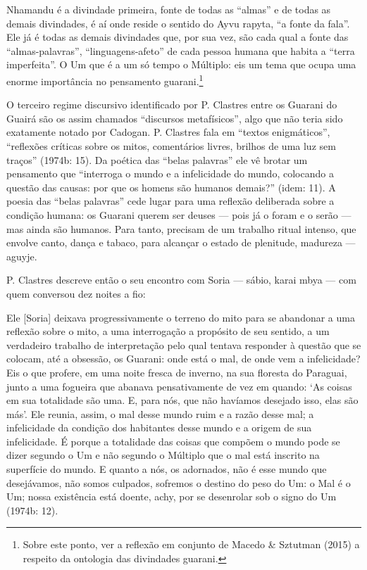 Nhamandu é a divindade primeira, fonte de todas as ``almas'' e de todas as
demais divindades, é aí onde reside o sentido do Ayvu rapyta, ``a fonte
da fala''. Ele já é todas as demais divindades que, por sua vez, são
cada qual a fonte das ``almas-palavras'', ``linguagens-afeto'' de cada
pessoa humana que habita a ``terra imperfeita''. O Um que é a um só tempo
o Múltiplo: eis um tema que ocupa uma enorme importância no pensamento
guarani.\footnote{Sobre este ponto, ver a reflexão em conjunto de
Macedo \& Sztutman (2015) a respeito da ontologia das divindades
guarani.}

O terceiro regime discursivo identificado por P. Clastres entre os
Guarani do Guairá são os assim chamados ``discursos metafísicos'', algo
que não teria sido exatamente notado por Cadogan. P. Clastres fala em
``textos enigmáticos'', ``reflexões críticas sobre os mitos, comentários
livres, brilhos de uma luz sem traços'' (1974b: 15). Da poética das
``belas palavras'' ele vê brotar um pensamento que ``interroga o mundo e a
infelicidade do mundo, colocando a questão das causas: por que os
homens são humanos demais?'' (idem: 11). A poesia das ``belas palavras''
cede lugar para uma reflexão deliberada sobre a condição humana: os
Guarani querem ser deuses — pois já o foram e o serão — mas ainda são
humanos. Para tanto, precisam de um trabalho ritual intenso, que
envolve canto, dança e tabaco, para alcançar o estado de plenitude,
madureza — aguyje. 

P. Clastres descreve então o seu encontro com Soria — sábio,  karai mbya
—  com quem conversou dez noites a fio: 

Ele [Soria] deixava progressivamente o terreno do mito para se abandonar
a uma reflexão sobre o mito, a uma interrogação a propósito de seu
sentido, a um verdadeiro trabalho de interpretação pelo qual tentava
responder à questão que se colocam, até a obsessão, os Guarani: onde
está o mal, de onde vem a infelicidade? Eis o que profere, em uma noite
fresca de inverno, na sua floresta do Paraguai, junto a uma fogueira
que abanava pensativamente de vez em quando: ‘As coisas em sua
totalidade são uma. E, para nós, que não havíamos desejado isso, elas
são más’. Ele reunia, assim, o mal desse mundo ruim e a razão desse
mal; a infelicidade da condição dos habitantes desse mundo e a origem
de sua infelicidade. É porque a totalidade das coisas que compõem o
mundo pode se dizer segundo o Um e não segundo o Múltiplo que o mal
está inscrito na superfície do mundo. E quanto a nós, os adornados, não
é esse mundo que desejávamos, não somos culpados, sofremos o destino do
peso do Um: o Mal é o Um; nossa existência está doente, achy, por se
desenrolar sob o signo do Um (1974b: 12).

